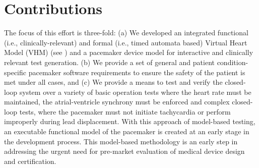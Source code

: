 \section{Contributions}
The focus of this effort is three-fold: (a) We developed an integrated functional (i.e., clinically-relevant) and formal (i.e., timed automata based) Virtual Heart Model  (VHM) (see ) and a pacemaker device model for interactive and clinically relevant test generation.  (b) We provide a set of general and patient condition-specific pacemaker software requirements to ensure the safety of the patient is met under all cases, and (c) We provide a means to test and verify the closed-loop system over a variety of basic operation tests where the heart rate must be maintained, the atrial-ventricle synchrony must be enforced and complex closed-loop tests, where the pacemaker must not initiate tachycardia or perform improperly during lead displacement. With this approach of model-based testing, an executable functional model of the pacemaker is created at an early stage in the development process. This model-based methodology is an early step in addressing the urgent need for pre-market evaluation of medical device design and certification.

